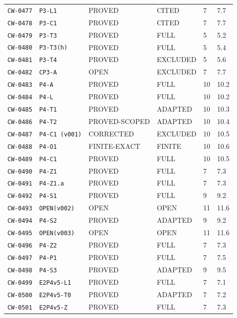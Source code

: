 \begin{center}
\begin{tabular}{@{}llllll@{}}
\texttt{CW-0477} & \texttt{P3-L1} & PROVED & CITED & 7 & 7.7\\
\texttt{CW-0478} & \texttt{P3-C1} & PROVED & CITED & 7 & 7.7\\
\texttt{CW-0479} & \texttt{P3-T3} & PROVED & FULL & 5 & 5.2\\
\texttt{CW-0480} & \texttt{P3-T3(h)} & PROVED & FULL & 5 & 5.4\\
\texttt{CW-0481} & \texttt{P3-T4} & PROVED & EXCLUDED & 5 & 5.6\\
\texttt{CW-0482} & \texttt{CP3-A} & OPEN & EXCLUDED & 7 & 7.7\\
\texttt{CW-0483} & \texttt{P4-A} & PROVED & FULL & 10 & 10.2\\
\texttt{CW-0484} & \texttt{P4-L} & PROVED & FULL & 10 & 10.2\\
\texttt{CW-0485} & \texttt{P4-T1} & PROVED & ADAPTED & 10 & 10.3\\
\texttt{CW-0486} & \texttt{P4-T2} & PROVED-SCOPED & ADAPTED & 10 & 10.4\\
\texttt{CW-0487} & \texttt{P4-C1 (v001)} & CORRECTED & EXCLUDED & 10 & 10.5\\
\texttt{CW-0488} & \texttt{P4-O1} & FINITE-EXACT & FINITE & 10 & 10.6\\
\texttt{CW-0489} & \texttt{P4-C1} & PROVED & FULL & 10 & 10.5\\
\texttt{CW-0490} & \texttt{P4-Z1} & PROVED & FULL & 7 & 7.3\\
\texttt{CW-0491} & \texttt{P4-Z1.a} & PROVED & FULL & 7 & 7.3\\
\texttt{CW-0492} & \texttt{P4-S1} & PROVED & FULL & 9 & 9.2\\
\texttt{CW-0493} & \texttt{OPEN(v002)} & OPEN & OPEN & 11 & 11.6\\
\texttt{CW-0494} & \texttt{P4-S2} & PROVED & ADAPTED & 9 & 9.2\\
\texttt{CW-0495} & \texttt{OPEN(v003)} & OPEN & OPEN & 11 & 11.6\\
\texttt{CW-0496} & \texttt{P4-Z2} & PROVED & FULL & 7 & 7.3\\
\texttt{CW-0497} & \texttt{P4-P1} & PROVED & FULL & 7 & 7.5\\
\texttt{CW-0498} & \texttt{P4-S3} & PROVED & ADAPTED & 9 & 9.5\\
\texttt{CW-0499} & \texttt{E2P4v5-L1} & PROVED & FULL & 7 & 7.1\\
\texttt{CW-0500} & \texttt{E2P4v5-T0} & PROVED & ADAPTED & 7 & 7.2\\
\texttt{CW-0501} & \texttt{E2P4v5-Z} & PROVED & FULL & 7 & 7.3\\

\end{tabular}
\end{center}
